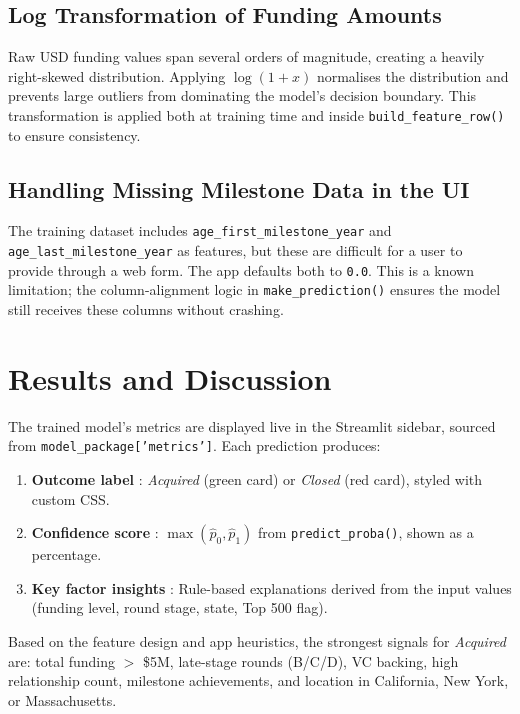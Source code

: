 \documentclass[12pt,a4paper]{article}
\begin{document}
\subsection{Log Transformation of Funding Amounts}

Raw USD funding values span several orders of magnitude, creating a heavily
right-skewed distribution. Applying $\log(1 + x)$ normalises the distribution and
prevents large outliers from dominating the model's decision boundary. This
transformation is applied both at training time and inside \texttt{build\_feature\_row()}
to ensure consistency.

\subsection{Handling Missing Milestone Data in the UI}

The training dataset includes \texttt{age\_first\_milestone\_year} and
\texttt{age\_last\_milestone\_year} as features, but these are difficult for a user
to provide through a web form. The app defaults both to \texttt{0.0}. This is a
known limitation; the column-alignment logic in \texttt{make\_prediction()} ensures
the model still receives these columns without crashing.

\section{Results and Discussion}

The trained model's metrics are displayed live in the Streamlit sidebar, sourced
from \texttt{model\_package['metrics']}. Each prediction produces:

\begin{enumerate}[leftmargin=1.5em]
    \item \textbf{Outcome label} : \textit{Acquired} (green card) or
          \textit{Closed} (red card), styled with custom CSS.
    \item \textbf{Confidence score} : $\max(\hat{p}_0, \hat{p}_1)$ from
          \texttt{predict\_proba()}, shown as a percentage.
    \item \textbf{Key factor insights} : Rule-based explanations derived from
          the input values (funding level, round stage, state, Top 500 flag).
\end{enumerate}

Based on the feature design and app heuristics, the strongest signals for
\textit{Acquired} are: total funding $>$ \$5M, late-stage rounds (B/C/D), VC
backing, high relationship count, milestone achievements, and location in
California, New York, or Massachusetts.
\end{document}
